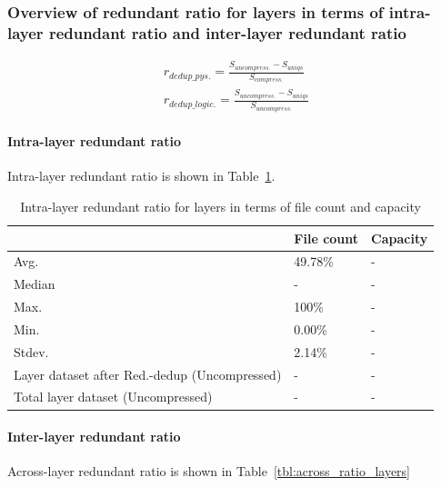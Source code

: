 \subsubsection{Overview of redundant ratio for layers in terms of intra-layer redundant ratio and inter-layer redundant ratio}

\begin{eqnarray}
r_{dedup\_pys.} = \frac{S_{uncompress.} - S_{uniqs}}{S_{compress.}} \\
r_{dedup\_logic.} = \frac{S_{uncompress.} - S_{uniqs}}{S_{uncompress.}}
\end{eqnarray}

\paragraph{Intra-layer redundant ratio} Intra-layer redundant ratio is shown in Table~\ref{tbl:per_ratio_layers}.

\begin{table} 
	\centering 
	\scriptsize  
	\caption{Intra-layer redundant ratio for layers in terms of file count and capacity} \label{tbl:per_ratio_layers} 
	\begin{tabular}{|l|l|l|}%
		\hline 
		& File count & Capacity \\
		\hline
		Avg. & 49.78\% & -\\
		\hline
		Median & - & - \\
		\hline
		Max. & 100\% & -\\
		\hline
		Min.  & 0.00\%  & -\\
		\hline
		Stdev.  &  2.14\% & -\\
		\hline
		Layer dataset after Red.-dedup (Uncompressed) & -  & -\\
		\hline 
		Total layer dataset (Uncompressed) &  -	& -\\
		\hline 
	\end{tabular} 
\end{table}

\paragraph{Inter-layer redundant ratio} Across-layer redundant ratio is shown in Table~\ref{tbl:across_ratio_layers}

